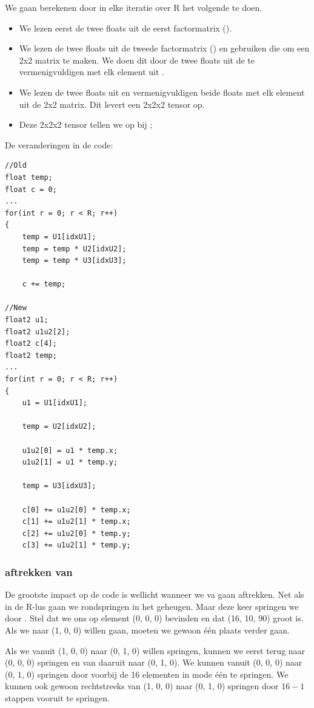 We gaan \CC{} berekenen door in elke iteratie over R het volgende te doen.
\begin{itemize}
    \item We lezen eerst de twee floats uit de eerst factormatrix ().
    \item We lezen de twee floats uit de tweede factormatrix () en gebruiken die om een 2x2 matrix te maken. We doen dit door de twee floats uit de  te vermenigvuldigen met elk element uit .
    \item We lezen de twee floats uit  en vermenigvuldigen beide floats met elk element uit de 2x2 matrix. Dit levert een 2x2x2 tensor op.
    \item Deze 2x2x2 tensor tellen we op bij \CC{};
\end{itemize}

De veranderingen in de code:
\begin{lstlisting}
//Old
float temp;
float c = 0;
...
for(int r = 0; r < R; r++)
{
	temp = U1[idxU1];
	temp = temp * U2[idxU2];
	temp = temp * U3[idxU3];

	c += temp;

//New
float2 u1;
float2 u1u2[2];
float2 c[4];
float2 temp;
...
for(int r = 0; r < R; r++)
{ 
	u1 = U1[idxU1];

	temp = U2[idxU2];

	u1u2[0] = u1 * temp.x;
	u1u2[1] = u1 * temp.y;

	temp = U3[idxU3];

	c[0] += u1u2[0] * temp.x;
	c[1] += u1u2[1] * temp.x;
	c[2] += u1u2[0] * temp.y;
	c[3] += u1u2[1] * temp.y;
\end{lstlisting}

\subsubsection{\TT{} aftrekken van \CC{}}
De grootste impact op de code is wellicht wanneer we \TT{} va \CC{} gaan aftrekken.  Net als in de R-lus gaan we rondspringen in het geheugen. Maar deze keer springen we door \TT{}.  Stel dat we ons op element (0, 0, 0) bevinden en dat \TT{} (16, 10, 90) groot is. Als we naar (1, 0, 0) willen gaan, moeten we gewoon \'e\'en plaats verder gaan.

Als we vanuit (1, 0, 0) naar (0, 1, 0) willen springen, kunnen we eerst terug naar (0, 0, 0) springen en van daaruit naar (0, 1, 0). We kunnen vanuit (0, 0, 0) naar (0, 1, 0) springen door voorbij de 16 elementen in mode \'e\'en te springen. We kunnen ook gewoon rechtstreeks van (1, 0, 0) naar (0, 1, 0) springen door $16-1$ stappen vooruit te springen.

